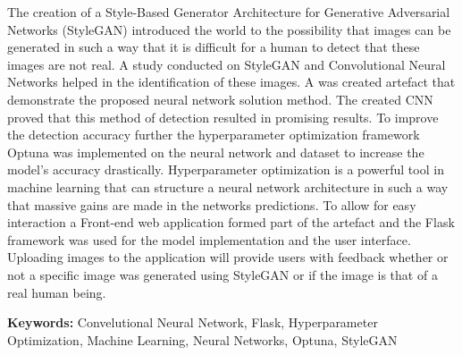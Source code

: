 \documentclass[a4paper,oneside,12pt]{book}
\begin{document}
\begin{Abstract}{}

The creation of a Style-Based Generator Architecture for Generative Adversarial Networks (StyleGAN) introduced the world to the possibility that images can be generated in such a way that it is difficult for a human to detect that these images are not real. A study conducted on StyleGAN and Convolutional Neural Networks helped in the identification of these images. A was created artefact that demonstrate the proposed neural network solution method. The created CNN proved that this method of detection resulted in promising results. To improve the detection accuracy further the hyperparameter optimization framework Optuna was implemented on the neural network and dataset to increase the model's accuracy drastically. Hyperparameter optimization is a powerful tool in machine learning that can structure a neural network architecture in such a way that massive gains are made in the networks predictions. To allow for easy interaction a Front-end web application formed part of the artefact  and the Flask framework was used for the model implementation and the user interface. Uploading images to the application will provide users with feedback whether or not a specific image was generated using StyleGAN or if the image is that of a real human being. 

\textbf{Keywords:} Convelutional Neural Network, Flask, Hyperparameter Optimization, Machine Learning, Neural Networks, Optuna, StyleGAN
\end{Abstract}
\end{document}
